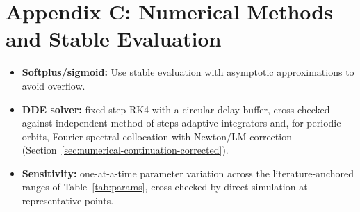 \documentclass[twocolumn,10pt]{article}
\begin{document}
\section{Appendix C: Numerical Methods and Stable Evaluation}
\begin{itemize}
\item \textbf{Softplus/sigmoid:} Use stable evaluation with asymptotic approximations to avoid overflow.
\item \textbf{DDE solver:} fixed-step RK4 with a circular delay buffer, cross-checked against independent method-of-steps adaptive integrators and, for periodic orbits, Fourier spectral collocation with Newton/LM correction (Section~\ref{sec:numerical-continuation-corrected}).
\item \textbf{Sensitivity:} one-at-a-time parameter variation across the literature-anchored ranges of Table~\ref{tab:params}, cross-checked by direct simulation at representative points.
\end{itemize}
\end{document}
